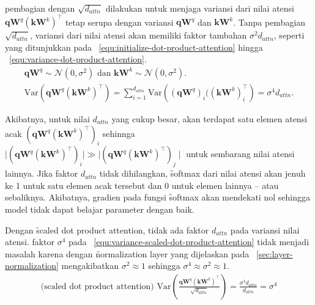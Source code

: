 	pembagian dengan $\sqrt{d_{attn}}$ dilakukan untuk menjaga variansi dari nilai atensi $\mathbf{q} \mathbf{W}^q (\mathbf{k} \mathbf{W}^k)^{\top}$ tetap serupa dengan variansi $\mathbf{qW}^q$ dan $\mathbf{kW}^k$. Tanpa pembagian $\sqrt{d_{attn}}$, variansi dari nilai atensi akan memiliki faktor tambahan $\sigma^2 d_{attn}$, seperti yang ditunjukkan pada \equ~\ref{equ:initialize-dot-product-attention} hingga \equ~\ref{equ:variance-dot-product-attention}.
	\begin{align}
		\label{equ:initialize-dot-product-attention}
		\mathbf{qW}^q \sim \mathcal{N}(0, \sigma^2) \text{ dan } \mathbf{kW}^k \sim \mathcal{N}(0, \sigma^2). \\
		\label{equ:variance-dot-product-attention}
		\text{Var}(\mathbf{qW}^q (\mathbf{kW}^k)^{\top}) = \sum_{i=1}^{d_{attn}} \text{Var}\left((\mathbf{qW}^q)_i ((\mathbf{kW}^k)^{\top}_i\right) = \sigma^4 d_{attn}.
	\end{align}
	
	Akibatnya, untuk nilai $d_{attn}$ yang cukup besar, akan terdapat satu elemen atensi acak $(\mathbf{qW}^q (\mathbf{kW}^k)^{\top})_i$ sehinnga $\mid (\mathbf{qW}^q (\mathbf{kW}^k)^{\top})_i\mid \gg \mid(\mathbf{qW}^q (\mathbf{kW}^k)^{\top})_j\mid$ untuk sembarang nilai atensi lainnya. Jika faktor $d_{attn}$ tidak dihilangkan, \f{softmax} dari nilai atensi akan jenuh ke 1 untuk satu elemen acak tersebut dan 0 untuk elemen lainnya -- atau sebaliknya. Akibatnya, gradien pada fungsi \f{softmax} akan mendekati nol sehingga model tidak dapat belajar parameter dengan baik. 

	Dengan \f{scaled dot product attention}, tidak ada faktor $d_{attn}$ pada variansi nilai atensi. faktor $\sigma^4$ pada \equ~\ref{equ:variance-scaled-dot-product-attention} tidak menjadi masalah karena dengan \f{normalization layer} yang dijelaskan pada \sect~\ref{sec:layer-normalization} mengakibatkan $\sigma^2 \approx 1$ sehingga $\sigma^4 \approx \sigma^2 \approx 1$.
	\begin{align}
		\label{equ:variance-scaled-dot-product-attention}
		\text{(scaled dot product attention) }\text{Var}\left(\frac{\mathbf{qW}^q (\mathbf{kW}^k)^{\top}}{\sqrt{d_{attn}}}\right) = \frac{\sigma^4 d_{attn}}{d_{attn}} = \sigma^4
	\end{align}

